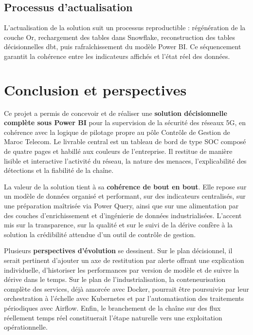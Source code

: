 \documentclass[12pt,a4paper,oneside]{report}
\begin{document}
\section{Processus d'actualisation}
L'actualisation de la solution suit un processus reproductible : régénération de la couche Or, rechargement des tables dans Snowflake, reconstruction des tables décisionnelles dbt, puis rafraîchissement du modèle Power BI. Ce séquencement garantit la cohérence entre les indicateurs affichés et l'état réel des données.

\chapter*{Conclusion et perspectives}

Ce projet a permis de concevoir et de réaliser une \textbf{solution décisionnelle complète sous Power BI} pour la supervision de la sécurité des réseaux 5G, en cohérence avec la logique de pilotage propre au pôle Contrôle de Gestion de Maroc Telecom. Le livrable central est un tableau de bord de type SOC composé de quatre pages et habillé aux couleurs de l'entreprise. Il restitue de manière lisible et interactive l'activité du réseau, la nature des menaces, l'explicabilité des détections et la fiabilité de la chaîne.

La valeur de la solution tient à sa \textbf{cohérence de bout en bout}. Elle repose sur un modèle de données organisé et performant, sur des indicateurs centralisés, sur une préparation maîtrisée via Power Query, ainsi que sur une alimentation par des couches d'enrichissement et d'ingénierie de données industrialisées. L'accent mis sur la transparence, sur la qualité et sur le suivi de la dérive confère à la solution la crédibilité attendue d'un outil de contrôle de gestion.

Plusieurs \textbf{perspectives d'évolution} se dessinent. Sur le plan décisionnel, il serait pertinent d'ajouter un axe de restitution par alerte offrant une explication individuelle, d'historiser les performances par version de modèle et de suivre la dérive dans le temps. Sur le plan de l'industrialisation, la conteneurisation complète des services, déjà amorcée avec Docker, pourrait être poursuivie par leur orchestration à l'échelle avec Kubernetes et par l'automatisation des traitements périodiques avec Airflow. Enfin, le branchement de la chaîne sur des flux réellement temps réel constituerait l'étape naturelle vers une exploitation opérationnelle.
\end{document}
